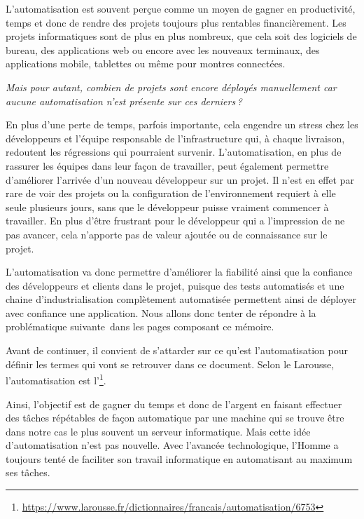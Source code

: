 
L'automatisation est souvent perçue comme un moyen de gagner en productivité, temps et donc de rendre des projets toujours plus rentables financièrement. Les projets informatiques sont de plus en plus nombreux, que cela soit des logiciels de bureau, des applications web ou encore avec les nouveaux terminaux, des applications mobile, tablettes ou même pour montres connectées.
	
\emph{Mais pour autant, combien de projets sont encore déployés manuellement car aucune automatisation n'est présente sur ces derniers ?}
	
En plus d'une perte de temps, parfois importante, cela engendre un stress chez les développeurs et l'équipe responsable de l'infrastructure qui, à chaque livraison, redoutent les régressions qui pourraient survenir. L'automatisation, en plus de rassurer les équipes dans leur façon de travailler, peut également permettre d'améliorer l'arrivée d'un nouveau développeur sur un projet. Il n'est en effet par rare de voir des projets ou la configuration de l'environnement requiert à elle seule plusieurs jours, sans que le développeur puisse vraiment commencer à travailler. En plus d'être frustrant pour le développeur qui a l'impression de ne pas avancer, cela n'apporte pas de valeur ajoutée ou de connaissance sur le projet.

L'automatisation va donc permettre d'améliorer la fiabilité ainsi que la confiance des développeurs et clients dans le projet, puisque des tests automatisés et une chaine d'industrialisation complètement automatisée permettent ainsi de déployer avec confiance une application. Nous allons donc tenter de répondre à la problématique suivante dans les pages composant ce mémoire.

\hrulefill

{\large \problematique}

\hrulefill

Avant de continuer, il convient de s'attarder sur ce qu'est l'automatisation pour définir les termes qui vont se retrouver dans ce document. Selon le Larousse, l'automatisation est l'\footnote{\url{https://www.larousse.fr/dictionnaires/francais/automatisation/6753}}. 

Ainsi, l'objectif est de gagner du temps et donc de l'argent en faisant effectuer des tâches répétables de façon automatique par une machine qui se trouve être dans notre cas le plus souvent un serveur informatique. Mais cette idée d'automatisation n'est pas nouvelle. Avec l'avancée technologique, l'Homme a toujours tenté de faciliter son travail informatique en automatisant au maximum ses tâches. 

